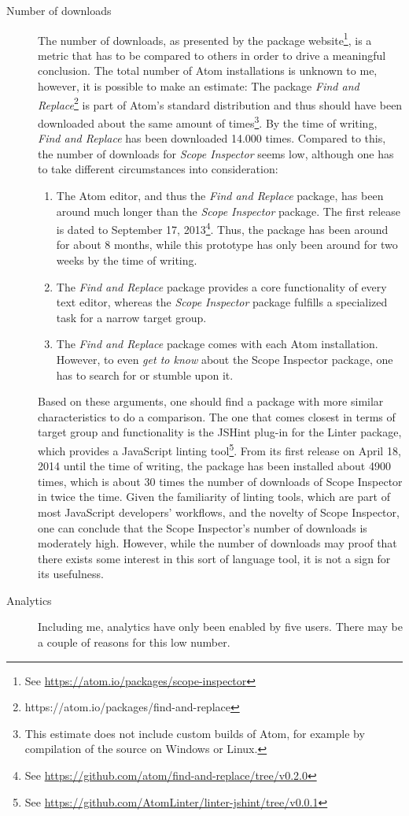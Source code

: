 \begin{description}
\item[Number of downloads]
The number of downloads, as presented by the package
website\footnote{See \url{https://atom.io/packages/scope-inspector}}, is
a metric that has to be compared to others in order to drive a
meaningful conclusion. The total number of Atom installations is unknown
to me, however, it is possible to make an estimate: The package
\emph{Find and
Replace}\footnote{https://atom.io/packages/find-and-replace} is part of
Atom’s standard distribution and thus should have been downloaded about
the same amount of
times\footnote{This estimate does not include custom builds of Atom, for example by compilation of the source on Windows or Linux.}.
By the time of writing, \emph{Find and Replace} has been downloaded
14.000 times. Compared to this, the number of downloads for \emph{Scope
Inspector} seems low, although one has to take different circumstances
into consideration:

\begin{enumerate}
\def\labelenumi{\arabic{enumi}.}
\itemsep1pt\parskip0pt
\item
  The Atom editor, and thus the \emph{Find and Replace} package, has
  been around much longer than the \emph{Scope Inspector} package. The
  first release is dated to September 17,
  2013\footnote{See \url{https://github.com/atom/find-and-replace/tree/v0.2.0}}.
  Thus, the package has been around for about 8 months, while this
  prototype has only been around for two weeks by the time of writing.
\item
  The \emph{Find and Replace} package provides a core functionality of
  every text editor, whereas the \emph{Scope Inspector} package fulfills
  a specialized task for a narrow target group.
\item
  The \emph{Find and Replace} package comes with each Atom installation.
  However, to even \emph{get to know} about the Scope Inspector package,
  one has to search for or stumble upon it.
\end{enumerate}

Based on these arguments, one should find a package with more similar
characteristics to do a comparison. The one that comes closest in terms
of target group and functionality is the JSHint plug-in for the Linter
package, which provides a JavaScript linting
tool\footnote{See \url{https://github.com/AtomLinter/linter-jshint/tree/v0.0.1}}.
From its first release on April 18, 2014 until the time of writing, the
package has been installed about 4900 times, which is about 30 times the
number of downloads of Scope Inspector in twice the time. Given the
familiarity of linting tools, which are part of most JavaScript
developers’ workflows, and the novelty of Scope Inspector, one can
conclude that the Scope Inspector’s number of downloads is moderately
high. However, while the number of downloads may proof that there exists
some interest in this sort of language tool, it is not a sign for its
usefulness.
\item[Analytics]
Including me, analytics have only been enabled by five users. There may
be a couple of reasons for this low number.


\end{description}
